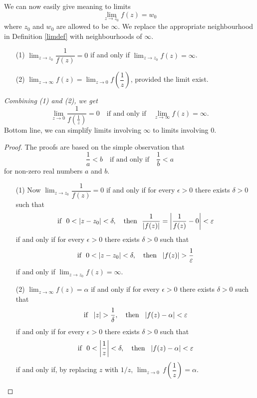 \begin{discussion}
We can now easily give meaning to limits
\[\lim_{z \to z_0}f(z) = w_0\]
where $z_0$ and $w_0$ are allowed to be $\infty$. We replace the appropriate neighbourhood in  Definition \ref{limdef} with neighbourhoods of $\infty$.
\end{discussion}

\vspace*{1em}

\begin{theorem}\hfill
\begin{itemize}
\item[(1)] $\displaystyle\lim_{z \to z_0} \dfrac{1}{f(z)} = 0$ if and only if $\displaystyle\lim_{z \to z_0}f(z) = \infty$.
\item[(2)] $\displaystyle\lim_{z \to \infty}f(z) = \lim_{z \to 0} f\left(\dfrac{1}{z}\right)$, provided the limit exist.
\end{itemize}
\emph{Combining (1) and (2), we get \[\displaystyle\lim_{z \to 0} \dfrac{1}{f\left(\frac{1}{z}\right)} = 0\quad \text{if and only if} \quad \displaystyle\lim_{z \to \infty}f(z) = \infty.\]}
Bottom line, we can simplify limits involving $\infty$ to limits involving $0$.
\end{theorem}
\begin{proof}
The proofs are based on the simple observation that
\[\frac{1}{a} < b \quad \text{if and only if} \quad \frac{1}{b} < a\]
for non-zero real numbers $a$ and $b$.
\begin{itemize}
\item[(1)] Now $\displaystyle\lim_{z \to z_0} \dfrac{1}{f(z)} = 0$ if and only if for every $\epsilon > 0$ there exists $\delta > 0$ such that 
\[\text{if }\ 0 < \left\lvert z - z_0\right\rvert < \delta,\quad \text{then }\ \frac{1}{\left\lvert f(z)\right\rvert} = \left\lvert\frac{1}{f(z)} - 0\right\rvert< \varepsilon\]
if and only if for every $\epsilon > 0$ there exists $\delta > 0$ such that 
\[\text{if }\ 0 < \abs{z - z_0} < \delta,\quad \text{then }\ \abs{f(z)}>\frac{1}{\epsilon}\]
if and only if
$\displaystyle\lim_{z \to z_0}f(z) = \infty$.
\item[(2)] $\displaystyle\lim_{z \to \infty}f(z) = \alpha$ if and only if for every $\epsilon > 0$ there exists $\delta > 0$ such that 
\[\text{if }\ \left\lvert z\right\rvert > \frac{1}{\delta},\quad \text{then }\ \left\lvert f(z) - \alpha\right\rvert< \varepsilon\]
if and only if for every $\epsilon > 0$ there exists $\delta > 0$ such that 
\[\text{if }\ 0 < \left\lvert\frac{1}{z}\right\rvert < \delta,\quad \text{then }\ \left\lvert f(z) - \alpha\right\rvert < \varepsilon\]
if and only if, by replacing $z$ with $1/z$, $\displaystyle\lim_{z \to 0}\,f\left(\dfrac{1}{z}\right) = \alpha$.
\end{itemize}
\end{proof}


